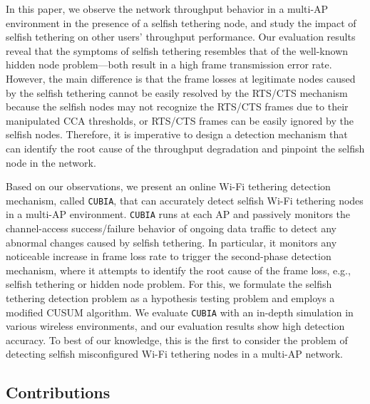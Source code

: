 In this paper, we observe the network throughput behavior in a multi-AP
environment in the presence of a selfish tethering node, and study the
impact of selfish tethering on other users' throughput performance.
%
Our evaluation results reveal that the symptoms of selfish tethering
resembles that of the well-known hidden node problem---both result in a
high frame transmission error rate.
%
However, the main difference is that the frame losses at legitimate nodes
caused by the selfish tethering cannot be easily resolved by the RTS/CTS
mechanism because the selfish nodes may not recognize the RTS/CTS frames
due to their manipulated CCA thresholds, or RTS/CTS frames can be easily
ignored by the selfish nodes.
%
Therefore, it is imperative to design a detection mechanism that can
identify the root cause of the throughput degradation and pinpoint the
selfish node in the network.

Based on our observations, we present an online Wi-Fi tethering
detection mechanism, called {\tt CUBIA}, that can accurately detect
selfish Wi-Fi tethering nodes in a multi-AP environment.
%
{\tt CUBIA} runs at each AP and passively monitors the channel-access
success/failure behavior of ongoing data traffic to detect any abnormal
changes caused by selfish tethering.
%
In particular, it monitors any noticeable increase in frame loss rate to
trigger the second-phase detection mechanism, where it attempts to identify
the root cause of the frame loss, e.g., selfish tethering or
hidden node problem.
%
For this, we formulate the selfish tethering detection problem as a
hypothesis testing problem and employs a modified CUSUM algorithm.
%
We evaluate {\tt CUBIA} with an in-depth simulation in various
wireless environments, and our evaluation results show high
detection accuracy.
%
To best of our knowledge, this is the first to consider the problem
of detecting selfish misconfigured Wi-Fi tethering nodes in
a multi-AP network.


\subsection{Contributions}

